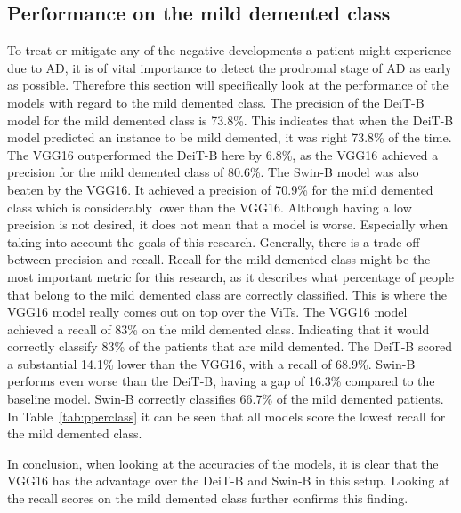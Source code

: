 \documentclass[11pt, a4paper]{article}
\begin{document}
\subsection{Performance on the mild demented class} \label{subs:mild}
To treat or mitigate any of the negative developments a patient might experience due to AD, it is of vital importance to detect the prodromal stage of AD as early as possible. Therefore this section will specifically look at the performance of the models with regard to the mild demented class. The precision of the DeiT-B model for the mild demented class is 73.8\%. This indicates that when the DeiT-B model predicted an instance to be mild demented, it was right 73.8\% of the time. The VGG16 outperformed the DeiT-B here by 6.8\%, as the VGG16 achieved a precision for the mild demented class of 80.6\%. The Swin-B model was also beaten by the VGG16. It achieved a precision of 70.9\% for the mild demented class which is considerably lower than the VGG16. Although having a low precision is not desired, it does not mean that a model is worse. Especially when taking into account the goals of this research. Generally, there is a trade-off between precision and recall. Recall for the mild demented class might be the most important metric for this research, as it describes what percentage of people that belong to the mild demented class are correctly classified. This is where the VGG16 model really comes out on top over the ViTs. The VGG16 model achieved a recall of 83\% on the mild demented class. Indicating that it would correctly classify 83\% of the patients that are mild demented. The DeiT-B scored a substantial 14.1\% lower than the VGG16, with a recall of 68.9\%. Swin-B performs even worse than the DeiT-B, having a gap of 16.3\% compared to the baseline model. Swin-B correctly classifies 66.7\% of the mild demented patients. In Table~\ref{tab:pperclass} it can be seen that all models score the lowest recall for the mild demented class. 

In conclusion, when looking at the accuracies of the models, it is clear that the VGG16 has the advantage over the DeiT-B and Swin-B in this setup. Looking at the recall scores on the mild demented class further confirms this finding. 
\end{document}
